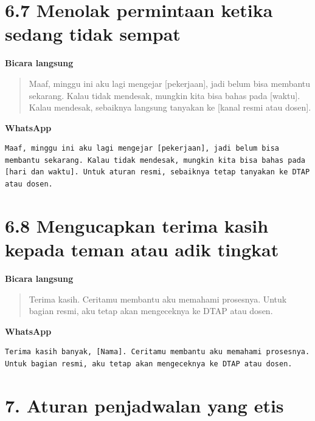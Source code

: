 \documentclass[
  indonesian,
]{article}
\renewcommand{\subsection}{\section}
\begin{document}
\subsection{6.7 Menolak permintaan ketika sedang tidak
sempat}\label{menolak-permintaan-ketika-sedang-tidak-sempat}

\textbf{Bicara langsung}

\begin{quote}
Maaf, minggu ini aku lagi mengejar {[}pekerjaan{]}, jadi belum bisa
membantu sekarang. Kalau tidak mendesak, mungkin kita bisa bahas pada
{[}waktu{]}. Kalau mendesak, sebaiknya langsung tanyakan ke {[}kanal
resmi atau dosen{]}.
\end{quote}

\textbf{WhatsApp}

\begin{verbatim}
Maaf, minggu ini aku lagi mengejar [pekerjaan], jadi belum bisa membantu sekarang. Kalau tidak mendesak, mungkin kita bisa bahas pada [hari dan waktu]. Untuk aturan resmi, sebaiknya tetap tanyakan ke DTAP atau dosen.
\end{verbatim}

\subsection{6.8 Mengucapkan terima kasih kepada teman atau adik
tingkat}\label{mengucapkan-terima-kasih-kepada-teman-atau-adik-tingkat}

\textbf{Bicara langsung}

\begin{quote}
Terima kasih. Ceritamu membantu aku memahami prosesnya. Untuk bagian
resmi, aku tetap akan mengeceknya ke DTAP atau dosen.
\end{quote}

\textbf{WhatsApp}

\begin{verbatim}
Terima kasih banyak, [Nama]. Ceritamu membantu aku memahami prosesnya. Untuk bagian resmi, aku tetap akan mengeceknya ke DTAP atau dosen.
\end{verbatim}

\section{7. Aturan penjadwalan yang
etis}\label{aturan-penjadwalan-yang-etis}
\end{document}
